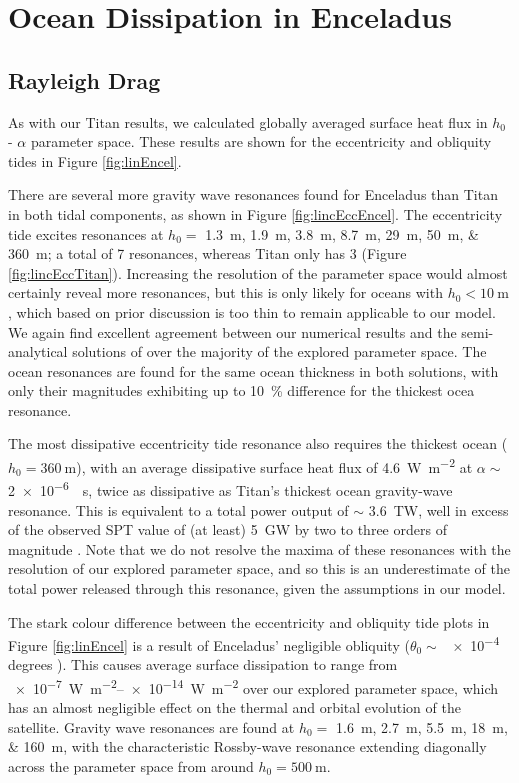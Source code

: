 \section{Ocean Dissipation in Enceladus \label{sec:results_Enceladus}}

\subsection{Rayleigh Drag} \label{sec:ray_enc}

As with our Titan results, we calculated globally averaged surface heat flux  in $h_0$ - $\alpha$ parameter space. These results are shown for the eccentricity and obliquity tides in Figure \ref{fig:linEncel}.

There are several more gravity wave resonances found for Enceladus than Titan in both tidal components, as shown in Figure \ref{fig:lincEccEncel}. The eccentricity tide excites resonances at $h_0 =$ \SIlist{1.3;1.9;3.8;8.7;29;50;360}{m}; a total of 7 resonances, whereas Titan only has 3 (Figure \ref{fig:lincEccTitan}). Increasing the resolution of the parameter space would almost certainly reveal more resonances, but this is only likely for oceans with $h_0 < \SI{10}{\metre}$, which based on prior discussion is too thin to remain applicable to our model. We again find excellent agreement between our numerical results and the semi-analytical solutions of \citet{matsuyama2014tidal} over the majority of the explored parameter space. The ocean resonances are found for the same ocean thickness in both solutions, with only their magnitudes exhibiting up to \SI{10}{\percent} difference for the thickest ocea resonance.

The most dissipative eccentricity tide resonance also requires the thickest ocean ($h_0 = \SI{360}{\metre}$), with an average dissipative surface heat flux of \SI{4.6}{\watt\per\square\metre} at $\alpha\sim$ \SI{2e-6}{\per\second}, twice as dissipative as Titan's thickest ocean gravity-wave resonance. This is equivalent to a total power output of $\sim$ \SI{3.6}{\tera\watt}, well in excess of the observed SPT value of (at least) \SI{5}{\giga\watt} by two to three orders of magnitude \citep{spencer2006cassini,howett2011high, spencer2013new}. Note that we do not resolve the maxima of these resonances with the resolution of our explored parameter space, and so this is an underestimate of the total power released through this resonance, given the assumptions in our model.

The stark colour difference between the eccentricity and obliquity tide plots in Figure \ref{fig:linEncel} is a result of Enceladus' negligible obliquity ($\theta_0 \sim$ \num{e-4} degrees \citep{chen2011obliquity, baland2016obliquity}). This causes average surface dissipation to range from \SIrange{e-7}{e-14}{\watt\per\square\metre} over our explored parameter space, which has an almost negligible effect on the thermal and orbital evolution of the satellite. Gravity wave resonances are found at $h_0 =$ \SIlist{1.6;2.7;5.5;18;160}{\metre}, with the characteristic Rossby-wave resonance extending diagonally across the parameter space from around $h_0 = \SI{500}{\metre}$.

